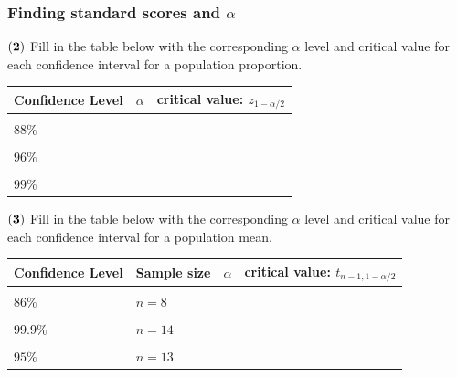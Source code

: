 \documentclass[
]{article}
\begin{document}
\subsubsection{\texorpdfstring{Finding standard scores and
\(\alpha\)}{Finding standard scores and \textbackslash alpha}}\label{finding-standard-scores-and-alpha}

\(\bf (2)\) Fill in the table below with the corresponding \(\alpha\)
level and critical value for each confidence interval for a population
proportion.

\begin{table}[H]
\centering\centering
\begin{tabular}{lll}
\toprule
Confidence Level & $\alpha$ & critical value: $z_{1-\alpha/2}$\\
\midrule
\cellcolor{gray!10}{$90\%$} & \cellcolor{gray!10}{} & \cellcolor{gray!10}{}\\
$88\%$ &  & \\
\cellcolor{gray!10}{$97\%$} & \cellcolor{gray!10}{} & \cellcolor{gray!10}{}\\
$96\%$ &  & \\
\cellcolor{gray!10}{$78\%$} & \cellcolor{gray!10}{} & \cellcolor{gray!10}{}\\
\addlinespace
$99\%$ &  & \\
\bottomrule
\end{tabular}
\end{table}

\(\bf (3)\) Fill in the table below with the corresponding \(\alpha\)
level and critical value for each confidence interval for a population
mean.

\begin{table}[H]
\centering\centering
\begin{tabular}{llll}
\toprule
Confidence Level & Sample size & $\alpha$ & critical value: $t_{n-1, 1-\alpha/2}$\\
\midrule
\cellcolor{gray!10}{$92\%$} & \cellcolor{gray!10}{$n = 5$} & \cellcolor{gray!10}{} & \cellcolor{gray!10}{}\\
$86\%$ & $n = 8$ &  & \\
\cellcolor{gray!10}{$98\%$} & \cellcolor{gray!10}{$n = 11$} & \cellcolor{gray!10}{} & \cellcolor{gray!10}{}\\
$99.9\%$ & $n = 14$ &  & \\
\cellcolor{gray!10}{$82\%$} & \cellcolor{gray!10}{$n = 40$} & \cellcolor{gray!10}{} & \cellcolor{gray!10}{}\\
\addlinespace
$95\%$ & $n = 13$ &  & \\
\bottomrule
\end{tabular}
\end{table}
\end{document}
